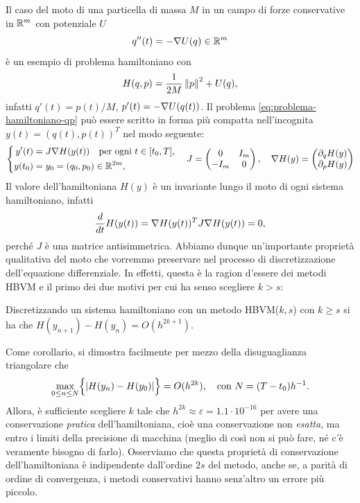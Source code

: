 \noindent Il caso del moto di una particella di massa $M$ in un campo
di forze conservative in $\mathbb{R}^m$ con potenziale $U$
\[
q''(t) = -\nabla U(q) \in \mathbb{R}^m
\]
è un esempio di problema hamiltoniano con
\[
H(q,p) = \frac{1}{2M} \left\lVert p\right\rVert^2 + U(q),
\]
infatti $q'(t) = p(t)/M$, $p'(t) = -\nabla U(q(t))$.
Il problema \eqref{eq:problema-hamiltoniano-qp} può essere scritto in forma
più compatta nell'incognita $y(t) = (q(t),p(t))^T$ nel modo seguente:
\begin{equation*} \label{eq:problema-hamiltoniano-y}
\left\{
\begin{aligned}
y'(t)  &= J \nabla H (y(t)) \quad \text{per ogni $t \in [t_0,T]$}, \\
y(t_0) &= y_0 = (q_0,p_0) \in \mathbb{R}^{2m},
\end{aligned}
\right.
\quad J = \begin{pmatrix}
0 & I_m \\ 
-I_m & 0
\end{pmatrix},
\quad \nabla H(y) = \begin{pmatrix}
\partial_q H(y) \\ 
\partial_p H(y)
\end{pmatrix} 
\end{equation*}
Il valore dell'hamiltoniana $H(y)$ è un invariante lungo il moto di ogni sistema
hamiltoniano, infatti
\[
\frac{d}{dt} H(y(t)) = \nabla H (y(t))^T J \nabla H(y(t)) = 0,
\]
perché $J$ è una matrice antisimmetrica. Abbiamo dunque un'importante proprietà
qualitativa del moto che vorremmo preservare nel processo di discretizzazione
dell'equazione differenziale. In effetti, questa è la ragion d'essere
dei metodi HBVM e il primo dei due motivi per cui ha senso scegliere $k > s$:

\begin{teor}
Discretizzando un sistema hamiltoniano con un metodo HBVM($k,s$) con $k \geq s$
si ha che $H(y_{n+1}) - H(y_n) = O(h^{2k+1})$.
\end{teor}

\noindent Come corollario, si dimostra facilmente per mezzo della disuguaglianza
triangolare che
\[
\max_{0 \leq n \leq N} \Bigl\lbrace \left\lvert H(y_n)-H(y_0)\right\rvert \Bigr\rbrace
= O(h^{2k}), \quad \text{con $N = (T-t_0)h^{-1}$.}
\]
Allora, è sufficiente scegliere $k$ tale che
$h^{2k} \approx \varepsilon = 1.1 \cdot 10^{-16}$ per avere
una conservazione \emph{pratica} dell'hamiltoniana,
cioè una conservazione non \emph{esatta}, ma entro i limiti della
precisione di macchina (meglio di così non si può fare, né c'è veramente
bisogno di farlo). Osserviamo che questa proprietà di conservazione dell'hamiltoniana
è indipendente dall'ordine $2s$ del metodo, anche se, a parità di
ordine di convergenza, i metodi conservativi hanno senz'altro un errore
più piccolo.


